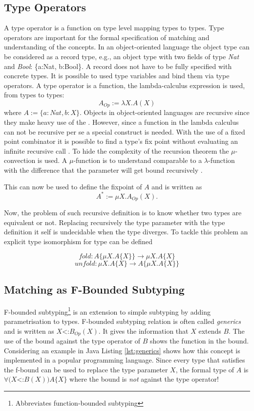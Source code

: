 \subsection{Type Operators}
 A type operator is a function on type level mapping types to
types. Type operators are important for the formal specification of
matching and understanding of the concepts. In an object-oriented language
the object type can be considered as a record type, e.g., an object type
with two fields of type \emph{Nat} and \emph{Bool}: \{a:Nat, b:Bool\}.
A record does not have to be fully specified with concrete types. It
is possible to used type variables and bind them via type operators.
A type operator is a function, the lambda-calculus expression is used,
from types to types: \[A_{Op} := \lambda X.A(X)
\] where $A := \{a:Nat, b:X\}$. Objects in object-oriented languages
are recursive since they make heavy use of the \mytype. However,
since a function in the lambda calculus can not be recursive
per se a special construct is needed. With the use of a fixed
point combinator it is possible to find a type's fix point without
evaluating an infinite recursive call \cite{gabriel_why_1988}. To
hide the complexity of the recursion theorem the $\mu$-convection is
used. A $\mu$-function is to understand comparable to a $\lambda$-function
with the difference that the parameter will get bound recursively
\cite{pierce_types_2002,simons_theory_2002-3}.

This can now be used to define the fixpoint of $A$ and is written as \[A^*
:= \mu X.A_{Op}(X).\]

Now, the problem of such recursive definition is to know whether two
types are equivalent or not. Replacing recursively the type parameter with
the type definition it self is undecidable when the type diverges. To tackle
this problem an explicit type isomorphism for type can be defined \cite{abadi_subtyping_1996}

\begin{defn}
	\label{def:foldUnfold}
	\[fold : A\{\mu X.A\{X\}\} \rightarrow \mu X.A\{X\}\]
	\[unfold : \mu X.A\{X\} \rightarrow A\{\mu X.A\{X\}\}\]
\end{defn}

\subsection{Matching as F-Bounded Subtyping}
F-bounded subtyping\footnote{Abbreviates function-bounded subtyping}
is an extension to simple subtyping by adding parametrisation to
types. F-bounded subtyping relation is often called \emph{generics}
and is written as $X$<:$B_{Op}(X)$. It gives the information that $X$
extends $B$. The use of the bound against the type operator of $B$
shows the function in the bound. Considering an example in Java
Listing \ref{lst:generics} shows how this concept is implemented in a popular
programming language. Since every type that satisfies the f-bound can
be used to replace the type parameter $X$, the formal type of $A$ is
$\forall(X$<:$B(X))A\{X\}$ where the bound is \emph{not} against the
type operator!

